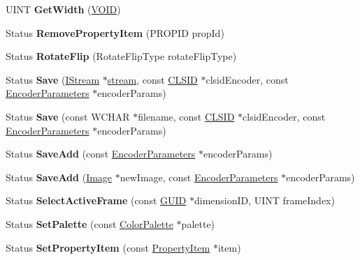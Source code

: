 \begin{DoxyCompactItemize}
U\+I\+NT {\bfseries Get\+Width} (\hyperlink{interfacevoid}{V\+O\+ID})
\item 
\mbox{\label{class_image_a9771c1310da2f4a531d08a12a71f36a2}} 
Status {\bfseries Remove\+Property\+Item} (P\+R\+O\+P\+ID prop\+Id)
\item 
\mbox{\label{class_image_a9f77b237826d247f17be5875cc7d49c3}} 
Status {\bfseries Rotate\+Flip} (Rotate\+Flip\+Type rotate\+Flip\+Type)
\item 
\mbox{\label{class_image_a816bd79f64b7ca4b46d26113eccb95e9}} 
Status {\bfseries Save} (\hyperlink{interface_i_stream}{I\+Stream} $\ast$\hyperlink{structstream}{stream}, const \hyperlink{struct___i_i_d}{C\+L\+S\+ID} $\ast$clsid\+Encoder, const \hyperlink{struct_encoder_parameters}{Encoder\+Parameters} $\ast$encoder\+Params)
\item 
\mbox{\label{class_image_a6f49a866bc199b153068fa2622f230da}} 
Status {\bfseries Save} (const W\+C\+H\+AR $\ast$filename, const \hyperlink{struct___i_i_d}{C\+L\+S\+ID} $\ast$clsid\+Encoder, const \hyperlink{struct_encoder_parameters}{Encoder\+Parameters} $\ast$encoder\+Params)
\item 
\mbox{\label{class_image_a739d3c06e621f9989578b33b3ca1f702}} 
Status {\bfseries Save\+Add} (const \hyperlink{struct_encoder_parameters}{Encoder\+Parameters} $\ast$encoder\+Params)
\item 
\mbox{\label{class_image_a090b6931d2509e84223b891668a116c7}} 
Status {\bfseries Save\+Add} (\hyperlink{class_image}{Image} $\ast$new\+Image, const \hyperlink{struct_encoder_parameters}{Encoder\+Parameters} $\ast$encoder\+Params)
\item 
\mbox{\label{class_image_a8ee0e7da4ccb917bda7853f9a847292e}} 
Status {\bfseries Select\+Active\+Frame} (const \hyperlink{interface_g_u_i_d}{G\+U\+ID} $\ast$dimension\+ID, U\+I\+NT frame\+Index)
\item 
\mbox{\label{class_image_a87d72c7a60e681de188d890bfa6da33d}} 
Status {\bfseries Set\+Palette} (const \hyperlink{struct_color_palette}{Color\+Palette} $\ast$palette)
\item 
\mbox{\label{class_image_a54c51e45f535f520288497a4f0693636}} 
Status {\bfseries Set\+Property\+Item} (const \hyperlink{struct_property_item}{Property\+Item} $\ast$item)
\end{DoxyCompactItemize}
